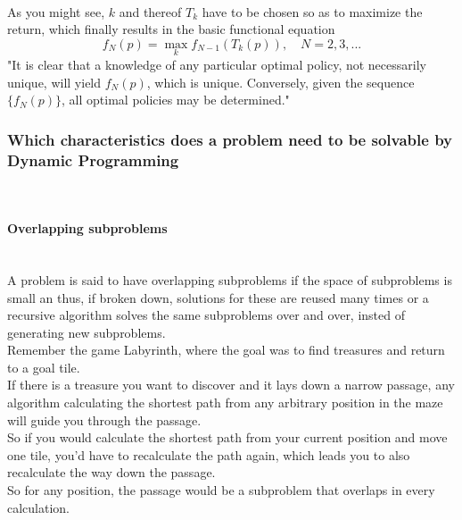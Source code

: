 \documentclass[conference]{IEEEtran}
\begin{document}
\\
As you might see, $k$ and thereof $T_k$ have to be chosen so as to maximize the return, which finally results in the basic functional equation
\begin{equation}
f_N(p) = \max_k f_{N-1}(T_k(p)), \quad N = 2, 3, ...
\end{equation}
"It is clear that a knowledge of any particular optimal policy, not necessarily unique, will yield $f_N(p)$, which is unique. Conversely, given the sequence $\{f_N(p)\}$, all optimal policies may be determined."\cite{Bellman.30.07.1954}
\\
\subsubsection{Which characteristics does a problem need to be solvable by Dynamic Programming}
\quad \\
\paragraph{Overlapping subproblems}
\quad \\
A problem is said to have overlapping subproblems if the space of subproblems is small an thus, if broken down, solutions for these are reused many times or a recursive algorithm solves the same subproblems over and over, insted of generating new subproblems.\\
Remember the game Labyrinth, where the goal was to find treasures and return to a goal tile.\\
If there is a treasure you want to discover and it lays down a narrow passage, any algorithm calculating the shortest path from any arbitrary position in the maze will guide you through the passage.\\
So if you would calculate the shortest path from your current position and move one tile, you'd have to recalculate the path again, which leads you to also recalculate the way down the passage.\\
So for any position, the passage would be a subproblem that overlaps in every calculation. 
\end{document}
